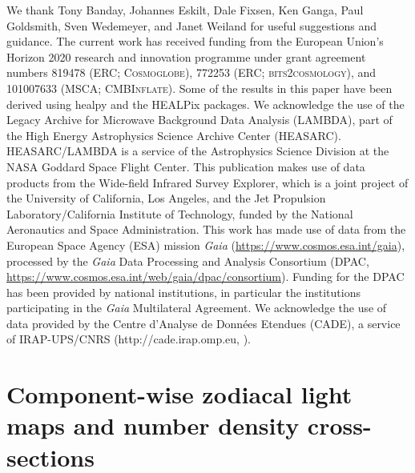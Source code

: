 \documentclass[twocolumn]{aa}
\begin{document}
\begin{acknowledgements}
  We thank Tony Banday, Johannes Eskilt, Dale Fixsen, Ken Ganga, Paul
  Goldsmith, Sven Wedemeyer, and Janet Weiland for useful suggestions
  and guidance.  The current work has received funding from the
  European Union’s Horizon 2020 research and innovation programme
  under grant agreement numbers 819478 (ERC; \textsc{Cosmoglobe}),
  772253 (ERC; \textsc{bits2cosmology}), and 101007633 (MSCA;
  \textsc{CMBInflate}).  Some of the results in this paper have been
  derived using healpy \citep{Zonca2019} and the HEALPix
  \citep{healpix} packages.  We acknowledge the use of the Legacy
  Archive for Microwave Background Data Analysis (LAMBDA), part of the
  High Energy Astrophysics Science Archive Center
  (HEASARC). HEASARC/LAMBDA is a service of the Astrophysics Science
  Division at the NASA Goddard Space Flight Center. This publication
  makes use of data products from the Wide-field Infrared Survey
  Explorer, which is a joint project of the University of California,
  Los Angeles, and the Jet Propulsion Laboratory/California Institute
  of Technology, funded by the National Aeronautics and Space
  Administration. This work has made use of data from the European
  Space Agency (ESA) mission {\it Gaia}
  (\url{https://www.cosmos.esa.int/gaia}), processed by the {\it Gaia}
  Data Processing and Analysis Consortium (DPAC,
  \url{https://www.cosmos.esa.int/web/gaia/dpac/consortium}). Funding
  for the DPAC has been provided by national institutions, in
  particular the institutions participating in the {\it Gaia}
  Multilateral Agreement.
  We acknowledge the use of data provided by the Centre d'Analyse de Données Etendues (CADE), a service of IRAP-UPS/CNRS (http://cade.irap.omp.eu, \citealt{paradis:2012}). 
\end{acknowledgements}


%



%

\appendix
\onecolumn

\section{Component-wise zodiacal light maps and number density cross-sections}
\label{sec:zodi-comps}
\end{document}
